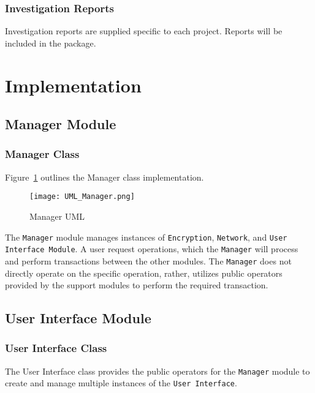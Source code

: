 \documentclass[sigconf]{acmart}
\begin{document}
\subsubsection{Investigation Reports}
Investigation reports are supplied specific to each project. Reports will be
included in the package.


\section{Implementation}

\subsection{Manager Module}
\subsubsection{Manager Class}
Figure~\ref{Manager UML} outlines the Manager class implementation.
\begin{figure}[htb]
 \begin{center}
  \texttt{[image: UML\_Manager.png]}
  \caption{Manager UML}
  \label{Manager UML}
 \end{center}
\end{figure}
The \texttt{Manager} module manages instances of \texttt{Encryption}, \texttt{Network}, and
\texttt{User Interface Module}. A user request operations, which the \texttt{Manager} will
process and perform transactions between the other modules. The \texttt{Manager} does not directly
operate on the specific operation, rather, utilizes public operators provided by the support
modules to perform the required transaction.

\subsection{User Interface Module}
\subsubsection{User Interface Class}
The User Interface class provides the public operators for the \texttt{Manager} module to create
and manage multiple instances of the \texttt{User Interface}.
\end{document}
